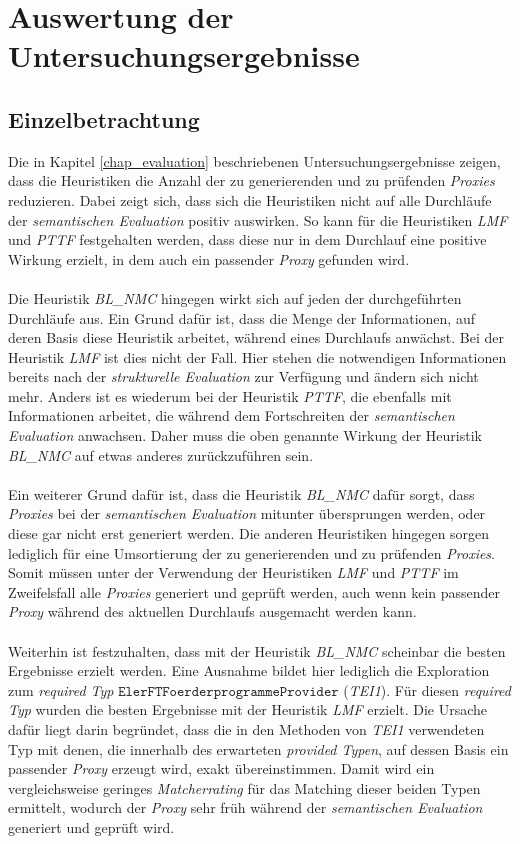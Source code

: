 \section{Auswertung der Untersuchungsergebnisse}
\subsection{Einzelbetrachtung}\label{disc_einzel}
Die in Kapitel \ref{chap_evaluation} beschriebenen Untersuchungsergebnisse zeigen, dass die \Gls{Heuristik}en die Anzahl der zu generierenden und zu prüfenden \emph{Proxies} reduzieren. Dabei zeigt sich, dass sich die \Gls{Heuristik}en nicht auf alle Durchläufe der \emph{semantischen Evaluation} positiv auswirken. So kann für die \Gls{Heuristik}en \emph{LMF} und \emph{PTTF} festgehalten werden, dass diese nur in dem Durchlauf eine positive Wirkung erzielt, in dem auch ein passender \emph{Proxy} gefunden wird.
\\\\
Die \Gls{Heuristik} \emph{BL\_NMC} hingegen wirkt sich auf jeden der durchgeführten Durchläufe aus. Ein Grund dafür ist, dass die Menge der Informationen, auf deren Basis diese \Gls{Heuristik} arbeitet, während eines Durchlaufs anwächst. Bei der \Gls{Heuristik} \emph{LMF} ist dies nicht der Fall. Hier stehen die notwendigen Informationen bereits nach der \emph{strukturelle Evaluation} zur Verfügung und ändern sich nicht mehr. Anders ist es wiederum bei der \Gls{Heuristik} \emph{PTTF}, die ebenfalls mit Informationen arbeitet, die während dem Fortschreiten der \emph{semantischen Evaluation} anwachsen. Daher muss die oben genannte Wirkung der \Gls{Heuristik} \emph{BL\_NMC} auf etwas anderes zurückzuführen sein. 
\\\\
Ein weiterer Grund dafür ist, dass die \Gls{Heuristik} \emph{BL\_NMC} dafür sorgt, dass \emph{Proxies} bei der \emph{semantischen Evaluation} mitunter übersprungen werden, oder diese gar nicht erst generiert werden. Die anderen \Gls{Heuristik}en hingegen sorgen lediglich für eine Umsortierung der zu generierenden und zu prüfenden \emph{Proxies}. Somit müssen unter der Verwendung der \Gls{Heuristik}en  \emph{LMF} und \emph{PTTF} im Zweifelsfall alle \emph{Proxies} generiert und geprüft werden, auch wenn kein passender \emph{Proxy} während des aktuellen Durchlaufs ausgemacht werden kann.
\\\\
Weiterhin ist festzuhalten, dass mit der \Gls{Heuristik} \emph{BL\_NMC} scheinbar die besten Ergebnisse erzielt werden. Eine Ausnahme bildet hier lediglich die Exploration zum \emph{required Typ} \linebreak$\texttt{ElerFTFoerderprogrammeProvider}$ (\emph{TEI1}). Für diesen \emph{required Typ} wurden die besten Ergebnisse mit der \Gls{Heuristik} \emph{LMF} erzielt. Die Ursache dafür liegt darin begründet, dass die in den Methoden von \emph{TEI1} verwendeten Typ mit denen, die innerhalb des erwarteten \emph{provided Typen}, auf dessen Basis ein passender \emph{Proxy} erzeugt wird, exakt übereinstimmen. Damit wird ein vergleichsweise geringes \emph{Matcherrating} für das Matching dieser beiden Typen ermittelt, wodurch der \emph{Proxy} sehr früh während der \emph{semantischen Evaluation} generiert und geprüft wird.
